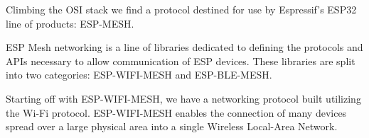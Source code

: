 \documentclass[11pt]{article}
\begin{document}
Climbing the OSI stack we find a protocol destined for use by Espressif's ESP32 line of products: ESP-MESH. \par \vspace{0.5 cm}
ESP Mesh networking is a line of libraries dedicated to defining the protocols and APIs necessary to allow communication of ESP devices. These libraries are split into two categories:
ESP-WIFI-MESH and ESP-BLE-MESH. \par \vspace{0.5 cm}

Starting off with ESP-WIFI-MESH, we have a networking protocol built utilizing the Wi-Fi protocol. ESP-WIFI-MESH enables the connection of many devices spread over a large physical area into a single Wireless Local-Area Network. \par \vspace{0.5 cm}
\end{document}
